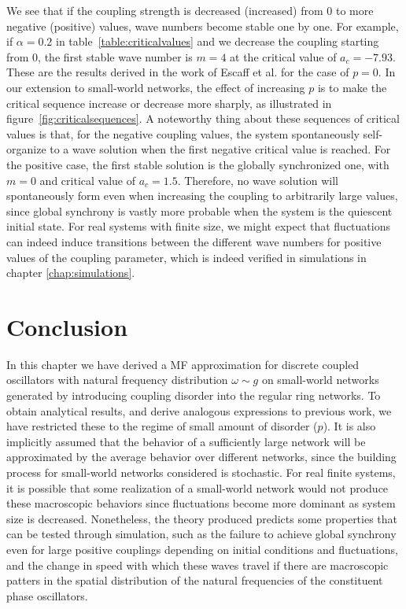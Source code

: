 \noindent We see that if the coupling strength is decreased (increased) from 0 to more negative (positive) values, wave numbers become
stable one by one. For example, if $\alpha=0.2$ in table~\ref{table:criticalvalues} and we decrease the coupling starting from 0, the
first stable wave number is $m=4$ at the critical value of $a_c=-7.93$. These are the results derived in the work of Escaff et
al.\cite{escaff2014arrays} for the case of $p=0$. In our extension to small-world networks, the effect of increasing $p$ is to make the
critical sequence increase or decrease more sharply, as illustrated in figure~\ref{fig:criticalsequences}. A noteworthy thing about
these sequences of critical values is that, for the negative coupling values, the system spontaneously self-organize to a wave solution
when the first negative critical value is reached. For the positive case, the first stable solution is the globally synchronized one,
with $m=0$ and critical value of $a_c=1.5$\cite{Wood06a,Wood06b,assis2011infinite,rodrigues2020synchronization}. Therefore, no wave
solution will spontaneously form even when increasing the coupling to arbitrarily large values, since global synchrony is vastly more
probable when the system is the quiescent initial state\cite{rodrigues2020synchronization}. For real systems with finite size, we might
expect that fluctuations can indeed induce transitions between the different wave numbers for positive values of the coupling
parameter, which is indeed verified in simulations in chapter \ref{chap:simulations}.

\section{Conclusion} In this chapter we have derived a MF approximation for discrete coupled oscillators with natural frequency
distribution $\omega\sim g$ on small-world networks generated by introducing coupling disorder into the regular ring networks. To
obtain analytical results, and derive analogous expressions to previous work, we have restricted these to the regime of small amount of
disorder ($p$). It is also implicitly assumed that the behavior of a sufficiently large network will be approximated by the average
behavior over different networks, since the building process for small-world networks considered is stochastic. For real finite
systems, it is possible that some realization of a small-world network would not produce these macroscopic behaviors since fluctuations
become more dominant as system size is decreased. Nonetheless, the theory produced predicts some properties that can be tested through
simulation, such as the failure to achieve global synchrony even for large positive couplings depending on initial conditions and
fluctuations, and the change in speed with which these waves travel if there are macroscopic patters in the spatial distribution of the
natural frequencies of the constituent phase oscillators.
